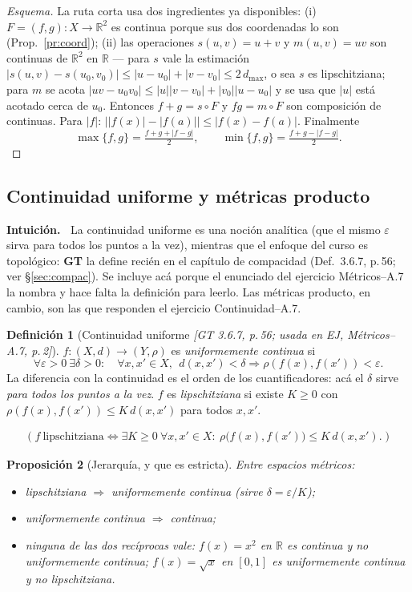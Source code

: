\documentclass[11pt,a4paper]{article}
\newenvironment{intuicion}{\begin{cajaint}\small\textbf{Intuición.\ }}{\end{cajaint}}
\newenvironment{lista}{\leavevmode\begin{itemize}[leftmargin=1.5em,itemsep=1pt,topsep=2pt,parsep=0pt]}{\end{itemize}}
\newcommand{\lgc}[1]{\par\vspace{-3pt}\begin{gather*}\big(\;#1\;\big)\end{gather*}\vspace{-6pt}}
\theoremstyle{definition}
\newtheorem{definicion}{Definición}[section]
\theoremstyle{plain}
\newtheorem{proposicion}[definicion]{Proposición}
\newcommand{\fnt}[1]{{\normalfont\small\itshape\color{gray!150!black}[#1]}}
\newcommand{\R}{\mathbb{R}}
\begin{document}
\begin{proof}[Esquema]
La ruta corta usa dos ingredientes ya disponibles: (i) $F=(f,g):X\to\R^2$ es continua porque sus dos coordenadas lo son (Prop.~\ref{pr:coord}); (ii) las operaciones $s(u,v)=u+v$ y $m(u,v)=uv$ son continuas de $\R^2$ en $\R$ --- para $s$ vale la estimación $|s(u,v)-s(u_0,v_0)|\le |u-u_0|+|v-v_0| \le 2\,d_{\max}$, o sea $s$ es lipschitziana; para $m$ se acota
$|uv-u_0v_0|\le |u||v-v_0|+|v_0||u-u_0|$ y se usa que $|u|$ está acotado cerca de $u_0$. Entonces $f+g=s\circ F$ y $fg=m\circ F$ son composición de continuas. Para $|f|$: $\big||f(x)|-|f(a)|\big|\le |f(x)-f(a)|$. Finalmente
\[
\max\{f,g\}=\tfrac{f+g+|f-g|}{2},\qquad \min\{f,g\}=\tfrac{f+g-|f-g|}{2}.
\]
\end{proof}



\subsection{Continuidad uniforme y métricas producto}\label{sec:unif}

\begin{intuicion}
La continuidad uniforme es una noción analítica (que el mismo $\varepsilon$ sirva para todos los puntos a la vez), mientras que el enfoque del curso es topológico: \textbf{GT} la define recién en el capítulo de compacidad (Def.\ 3.6.7, p.\,56; ver \S\ref{sec:compac}). Se incluye acá porque el enunciado del ejercicio Métricos--A.7 la nombra y hace falta la definición para leerlo. Las métricas producto, en cambio, son las que responden el ejercicio Continuidad--A.7.
\end{intuicion}

\begin{definicion}[Continuidad uniforme \fnt{GT 3.6.7, p.\,56; usada en EJ, Métricos--A.7, p.\,2}]
$f:(X,d)\to(Y,\rho)$ es \emph{uniformemente continua} si
\[
\forall\varepsilon>0\ \exists\delta>0:\quad \forall x,x'\in X,\ \ d(x,x')<\delta \Rightarrow \rho(f(x),f(x'))<\varepsilon .
\]
La diferencia con la continuidad es el orden de los cuantificadores: acá el $\delta$ sirve \emph{para todos los puntos a la vez}. $f$ es \emph{lipschitziana} si existe $K\ge0$ con $\rho(f(x),f(x'))\le K\,d(x,x')$ para todos $x,x'$.
\lgc{f\ \text{lipschitziana}\iff \exists K\ge0\ \forall x,x'\in X:\ \rho\big(f(x),f(x')\big)\le K\,d(x,x').}
\end{definicion}

\begin{proposicion}[Jerarquía, y que es estricta]
Entre espacios métricos:
\begin{lista}
\item lipschitziana $\Rightarrow$ uniformemente continua (sirve $\delta=\varepsilon/K$);
\item uniformemente continua $\Rightarrow$ continua;
\item ninguna de las dos recíprocas vale: $f(x)=x^2$ en $\R$ es continua y no uniformemente continua; $f(x)=\sqrt{x}$ en $[0,1]$ es uniformemente continua y no lipschitziana.
\end{lista}
\end{proposicion}
\end{document}
